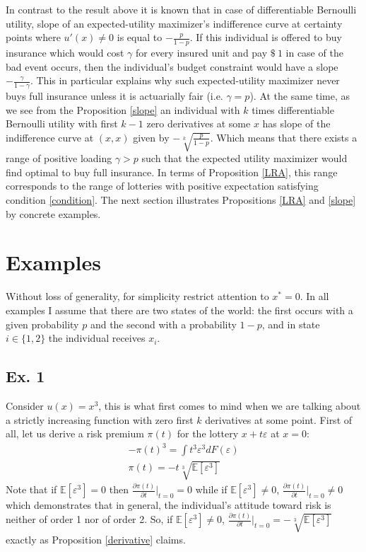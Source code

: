 \documentclass[a4paper]{article}
\newcommand{\expect}{\mathbb{E}}
\newcommand{\eps}{\varepsilon}
\begin{document}
In contrast to the result above it is known that in case of differentiable Bernoulli utility, slope of an expected-utility maximizer's indifference curve at certainty points where $u'(x) \neq 0$ is equal to $-\frac{p}{1-p}$. If this individual is offered to buy insurance which would cost $\gamma$ for every insured unit and pay $\$\ 1$ in case of the bad event occurs, then the individual's budget constraint would have a slope $-\frac{\gamma}{1-\gamma}$. This in particular explains why such expected-utility maximizer never buys full insurance unless it is actuarially fair (i.e. $\gamma = p$). At the same time, as we see from the Proposition \ref{slope} an individual with $k$ times differentiable Bernoulli utility with first $k-1$ zero derivatives at some $x$ has slope of the indifference curve at $(x, x)$ given by $-\sqrt[k]{\frac{p}{1-p}}$. Which means that there exists a range of positive loading $\gamma > p$ such that the expected utility maximizer would find optimal to buy full insurance. In terms of Proposition \ref{LRA}, this range corresponds to the range of lotteries with positive expectation satisfying condition \eqref{condition}. The next section illustrates Propositions \ref{LRA} and \ref{slope} by concrete examples.
\section{Examples}
Without loss of generality, for simplicity restrict attention to $x^* = 0$. In all examples I assume that there are two states of the world: the first occurs with a given probability $p$ and the second with a probability $1-p$, and in state $i\in\{1, 2\}$ the individual receives $x_i$.
\subsection{Ex. 1}
Consider $u(x) = x^3$, this is what first comes to mind when we are talking about a strictly increasing function with zero first $k$ derivatives at some point. First of all, let us derive a risk premium $\pi(t)$ for the lottery $x+t\eps$ at $x = 0$:
\begin{align}
	-\pi(t)^3 = \int t^3 \eps^3 dF(\eps)\\
	\pi(t) = -t \sqrt[3]{\expect[\eps^3]}
\end{align}
Note that if $\expect[\eps^3] = 0$ then $\frac{\partial \pi(t)}{\partial t}\bigg|_{t=0} = 0$ while if $\expect[\eps^3] \neq 0$, $\frac{\partial \pi(t)}{\partial t}\bigg|_{t=0} \neq 0$ which demonstrates that in general, the individual's attitude toward risk is neither of order 1 nor of order 2.
So, if $\expect[\eps^3] \neq 0$, $\frac{\partial \pi(t)}{\partial t}\bigg|_{t=0} = -\sqrt[3]{\expect[\eps^3]}$ exactly as Proposition \ref{derivative} claims.
\end{document}

